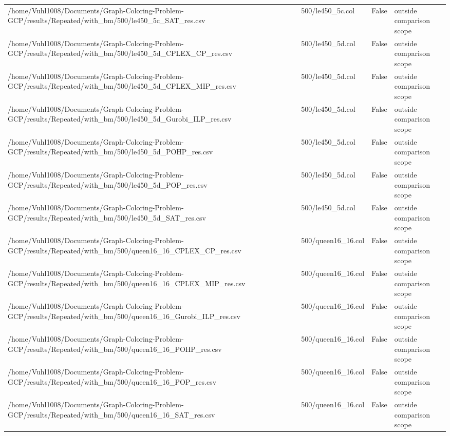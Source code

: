 \begin{table}[htbp]
\begin{tabular}{llll}
/home/Vuhl1008/Documents/Graph-Coloring-Problem-GCP/results/Repeated/with\_bm/500/le450\_5c\_SAT\_res.csv & 500/le450\_5c.col & False & outside comparison scope \\
/home/Vuhl1008/Documents/Graph-Coloring-Problem-GCP/results/Repeated/with\_bm/500/le450\_5d\_CPLEX\_CP\_res.csv & 500/le450\_5d.col & False & outside comparison scope \\
/home/Vuhl1008/Documents/Graph-Coloring-Problem-GCP/results/Repeated/with\_bm/500/le450\_5d\_CPLEX\_MIP\_res.csv & 500/le450\_5d.col & False & outside comparison scope \\
/home/Vuhl1008/Documents/Graph-Coloring-Problem-GCP/results/Repeated/with\_bm/500/le450\_5d\_Gurobi\_ILP\_res.csv & 500/le450\_5d.col & False & outside comparison scope \\
/home/Vuhl1008/Documents/Graph-Coloring-Problem-GCP/results/Repeated/with\_bm/500/le450\_5d\_POHP\_res.csv & 500/le450\_5d.col & False & outside comparison scope \\
/home/Vuhl1008/Documents/Graph-Coloring-Problem-GCP/results/Repeated/with\_bm/500/le450\_5d\_POP\_res.csv & 500/le450\_5d.col & False & outside comparison scope \\
/home/Vuhl1008/Documents/Graph-Coloring-Problem-GCP/results/Repeated/with\_bm/500/le450\_5d\_SAT\_res.csv & 500/le450\_5d.col & False & outside comparison scope \\
/home/Vuhl1008/Documents/Graph-Coloring-Problem-GCP/results/Repeated/with\_bm/500/queen16\_16\_CPLEX\_CP\_res.csv & 500/queen16\_16.col & False & outside comparison scope \\
/home/Vuhl1008/Documents/Graph-Coloring-Problem-GCP/results/Repeated/with\_bm/500/queen16\_16\_CPLEX\_MIP\_res.csv & 500/queen16\_16.col & False & outside comparison scope \\
/home/Vuhl1008/Documents/Graph-Coloring-Problem-GCP/results/Repeated/with\_bm/500/queen16\_16\_Gurobi\_ILP\_res.csv & 500/queen16\_16.col & False & outside comparison scope \\
/home/Vuhl1008/Documents/Graph-Coloring-Problem-GCP/results/Repeated/with\_bm/500/queen16\_16\_POHP\_res.csv & 500/queen16\_16.col & False & outside comparison scope \\
/home/Vuhl1008/Documents/Graph-Coloring-Problem-GCP/results/Repeated/with\_bm/500/queen16\_16\_POP\_res.csv & 500/queen16\_16.col & False & outside comparison scope \\
/home/Vuhl1008/Documents/Graph-Coloring-Problem-GCP/results/Repeated/with\_bm/500/queen16\_16\_SAT\_res.csv & 500/queen16\_16.col & False & outside comparison scope \\

\end{tabular}
\end{table}
